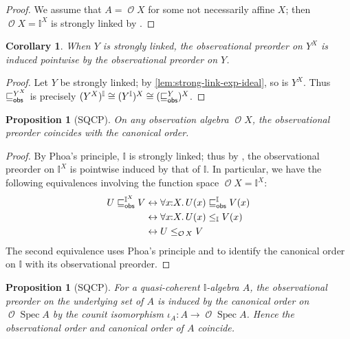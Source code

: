 \documentclass[a4paper,12pt]{amsart}
\newtheorem{corollary}[theorem]{Corollary}
\newtheorem{proposition}[theorem]{Proposition}
\theoremstyle{definition}
\newcommand{\mc}[1]{\mathcal{#1}}
\newcommand{\mbb}[1]{\mathbb{#1}}
\newcommand{\I}{\mbb I}
\newcommand{\fa}[2]{\forall #1\!\colon\!\!#2\mathpunct{.}}
\newcommand{\eq}{\leftrightarrow}
\newcommand{\spec}{\operatorname{Spec}}
\newcommand{\opens}{\operatorname{\mc{O}}} %
\begin{document}
\begin{proof}
  We assume that $A=\opens{X}$ for some not necessarily affine $X$; then $\opens{X}=\I^X$ is strongly linked by .
\end{proof}


\begin{corollary}\label{cor:strong-link-obs-pw}
  When $Y$ is strongly linked, the observational preorder on $Y^X$ is induced pointwise by the observational preorder on $Y$.
\end{corollary}

\begin{proof}
  Let $Y$ be strongly linked; by \cref{lem:strong-link-exp-ideal}, so is $Y^X$. Thus $\obsle[Y^X]$ is precisely $(Y^X)^\I\cong (Y^\I)^X\cong (\obsle[Y])^X$.
\end{proof}

\begin{proposition}[SQCP]\label{prop:specordopens}
  On any observation algebra $\opens{X}$, the observational preorder coincides with the canonical order.
\end{proposition}

\begin{proof}
  By Phoa's principle, $\I$ is strongly linked; thus by , the observational preorder on $\I^X$ is pointwise induced by that of $\I$. In particular, we have the following equivalences involving the function space $\opens{X}=\I^X$:
  \begin{align*}
    U\obsle[\I^X]V 
    &\eq \fa{x}{X} U(x)\obsle[\I] V(x)
    \\
    &\eq \fa{x}{X} U(x)\le_{\I} V(x)
    \\
    &\eq U\le_{\opens{X}} V \qedhere
  \end{align*}
  The second equivalence uses Phoa's principle and  to identify the canonical order on $\I$ with its observational preorder.
% 
\end{proof}

\begin{proposition}[SQCP]\label{cor:specordonalgiscan}
  For a quasi-coherent $\I$-algebra $A$, the observational preorder on the underlying set of $A$ is induced by the canonical order on $\opens\spec{A}$ by the counit isomorphism $\iota_A\colon A\to \opens\spec{A}$. Hence the observational order and canonical order of $A$ coincide.
\end{proposition}
\end{document}
